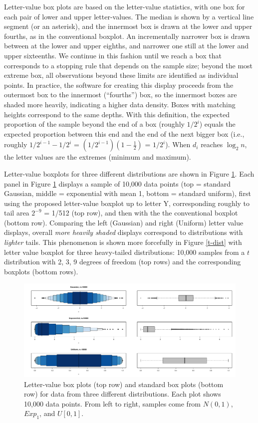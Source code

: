 \documentclass[oneside]{article}
\begin{document}
Letter-value box plots are based on the letter-value statistics,
with one box for each pair of lower and upper letter-values.
The median is shown by a vertical line segment (or an asterisk),
and the innermost box is drawn at the lower and upper fourths, 
as in the conventional boxplot.
An incrementally narrower box is drawn between at the lower
and upper eighths, and narrower one still at the lower
and upper sixteenths.
We continue in this fashion until we reach a box that corresponds 
to a stopping rule that depends on the sample size; beyond the 
most extreme box, all observations beyond these limits 
are identified as individual points.
In practice, the software for creating this display
proceeds from the outermost box to the innermost (``fourths'')
box, so the innermost boxes are shaded more heavily,
indicating a higher data density.
Boxes with matching heights correspond to the same depths.
With this definition, the expected proportion of the 
sample beyond the end of a box (roughly $1/2^i$)
equals the expected proportion between this end 
and the end of the next bigger box
(i.e., roughly $1/2^{i-1} - 1/2^i$ = $(1/2^{i-1})(1 - \frac{1}{2})$
= $1 / 2^i$).
When $d_i$ reaches $\log_2 n$, the letter values are the extremes
(minimum and maximum).

Letter-value boxplots for three different distributions are 
shown in Figure \ref{stackbox}. 
Each panel in Figure \ref{stackbox} displays a sample of 10,000 
data points (top = standard Gaussian, middle = exponential 
with mean 1, bottom = standard uniform),
first using the proposed letter-value boxplot
up to letter Y, corresponding roughly to tail area $2^{-9}$
= 1/512 (top row), and then with the
the conventional boxplot (bottom row).
Comparing the left (Gaussian) and right (Uniform) letter
value displays, overall \textit{more heavily shaded} displays 
correspond to distributions with \textit{lighter} tails.  
This phenomenon is shown more forcefully in 
Figure \ref{t-dist} with letter value boxplot for three heavy-tailed
distributions: 10,000 samples from a $t$ distribution with 2, 3, 9
degrees of freedom (top rows) and the corresponding boxplots
(bottom rows).

\begin{figure}[hbtp]
  \centering
  \includegraphics[scale=.5,angle=270]{boxplots}

  \caption{Letter-value box plots (top row) and standard box plots (bottom
  row) for data from three different distributions. Each plot shows 10,000
  data points. From left to right, samples come from $N(0,1)$, $Exp_1$, and
  $U[0,1]$. }
  \label{stackbox}
\end{figure}
\end{document}
